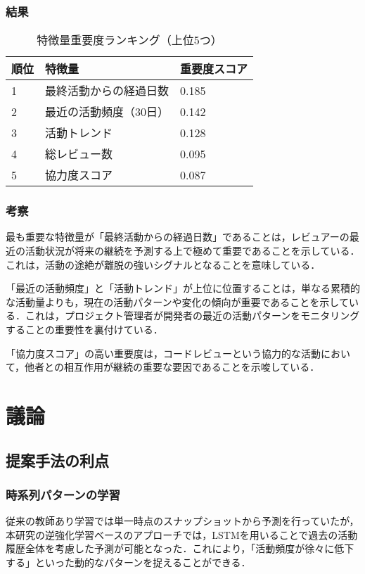 \subsubsection{結果}
\begin{table}[h]
    \centering
    \caption{特徴量重要度ランキング（上位5つ）}
    \begin{tabularx}{\columnwidth}{XXX}
        \hline
        順位 & 特徴量 & 重要度スコア \\
        \hline
        1 & 最終活動からの経過日数 & 0.185 \\
        2 & 最近の活動頻度（30日） & 0.142 \\
        3 & 活動トレンド & 0.128 \\
        4 & 総レビュー数 & 0.095 \\
        5 & 協力度スコア & 0.087 \\
        \hline
    \end{tabularx}
    \label{table:feature_importance}
\end{table}

\subsubsection{考察}
最も重要な特徴量が「最終活動からの経過日数」であることは，レビュアーの最近の活動状況が将来の継続を予測する上で極めて重要であることを示している．これは，活動の途絶が離脱の強いシグナルとなることを意味している．

「最近の活動頻度」と「活動トレンド」が上位に位置することは，単なる累積的な活動量よりも，現在の活動パターンや変化の傾向が重要であることを示している．これは，プロジェクト管理者が開発者の最近の活動パターンをモニタリングすることの重要性を裏付けている．

「協力度スコア」の高い重要度は，コードレビューという協力的な活動において，他者との相互作用が継続の重要な要因であることを示唆している．

\section{議論}
\label{sec:discussion}

\subsection{提案手法の利点}

\subsubsection{時系列パターンの学習}
従来の教師あり学習では単一時点のスナップショットから予測を行っていたが，本研究の逆強化学習ベースのアプローチでは，LSTMを用いることで過去の活動履歴全体を考慮した予測が可能となった．これにより，「活動頻度が徐々に低下する」といった動的なパターンを捉えることができる．

